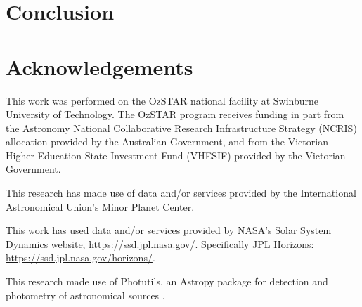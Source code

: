 \documentclass{UCreport}
\begin{document}
\section{Conclusion}\label{Sec:Conc}



\newpage %

\section*{Acknowledgements}
\small
This work was performed on the OzSTAR national facility at Swinburne University of Technology.
The OzSTAR program receives funding in part from the Astronomy National Collaborative Research Infrastructure Strategy (NCRIS) allocation provided by the Australian Government, and from the Victorian Higher Education State Investment Fund (VHESIF) provided by the Victorian Government.

This research has made use of data and/or services provided by the International Astronomical Union's Minor Planet Center.

This work has used data and/or services provided by NASA's Solar System Dynamics website, \url{https://ssd.jpl.nasa.gov/}. Specifically JPL Horizons: \url{https://ssd.jpl.nasa.gov/horizons/}.

This research made use of Photutils, an Astropy package for detection and photometry of astronomical sources \citep{Bradley2024}.

% 

\end{document}

